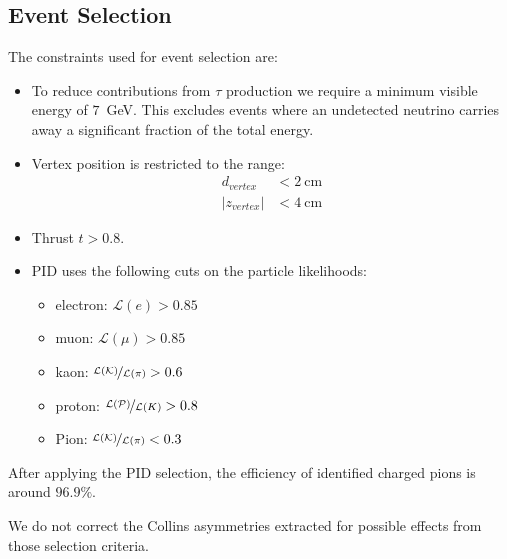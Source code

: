 \subsection{Event Selection}
\label{sec:eventselection}
The constraints used for event selection are:
\begin{itemize}
\item To reduce contributions from $\tau$ production we require a minimum visible energy of $7$~GeV.  This excludes events where an undetected neutrino carries away a significant fraction of the total energy.
\item Vertex position is restricted to the range:
\begin{align}
d_{vertex}&<2~\text{cm}   \nonumber \\
\lvert z_{vertex}\rvert &< 4~\text{cm} \nonumber
\end{align}
\item Thrust $t>0.8$.
\item PID uses the following cuts on the particle likelihoods:
\begin{itemize}
  \item electron: $\mathcal{L}(e)>0.85$
  \item muon: $\mathcal{L}(\mu)>0.85$
  \item kaon: $\nicefrac{\mathcal{L}(\mathcal{K})}{\mathcal{L}(\pi)}>0.6$
  \item proton: $\nicefrac{\mathcal{L}(\mathcal{P})}{\mathcal{L}(K)}>0.8$
  \item Pion: $\nicefrac{\mathcal{L}(\mathcal{K})}{\mathcal{L}(\pi)}<0.3$
\end{itemize}
\end{itemize}
After applying the PID selection, the efficiency of identified charged pions is around $96.9\%$. 

We do not correct the Collins asymmetries extracted for possible effects from those selection criteria. 

